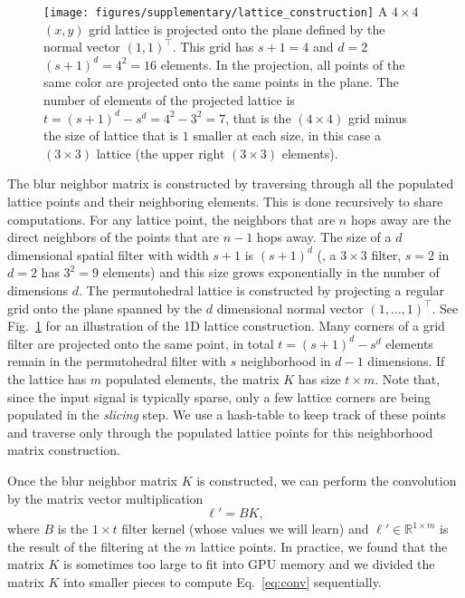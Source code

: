 \begin{figure}[t!]
  \centering
    \texttt{[image: figures/supplementary/lattice\_construction]}
  {A $4\times 4$ $(x,y)$ grid lattice is projected onto the plane defined by the normal
  vector $(1,1)^{\top}$. This grid has $s+1=4$ and $d=2$ $(s+1)^{d}=4^2=16$ elements.
  In the projection, all points of the same color are projected onto the same points in the plane.
  The number of elements of the projected lattice is $t=(s+1)^d-s^d=4^2-3^2=7$, that is
  the $(4\times 4)$ grid minus the size of lattice that is $1$ smaller at each size, in this
  case a $(3\times 3)$ lattice (the upper right $(3\times 3)$ elements).
  }
\label{fig:latticeconstruction}
\end{figure}

The blur neighbor matrix is constructed by traversing through all the populated
lattice points and their neighboring elements.
This is done recursively to share computations. For any lattice point, the neighbors that are
$n$ hops away are the direct neighbors of the points that are $n-1$ hops away.
The size of a $d$ dimensional spatial filter with width $s+1$ is $(s+1)^{d}$ (\eg, a
$3\times 3$ filter, $s=2$ in $d=2$ has $3^2=9$ elements) and this size grows
exponentially in the number of dimensions $d$. The permutohedral lattice is constructed by
projecting a regular grid onto the plane spanned by the $d$ dimensional normal vector ${(1,\ldots,1)}^{\top}$. See
Fig.~\ref{fig:latticeconstruction} for an illustration of the 1D lattice construction.
Many corners of a grid filter are projected onto the same point, in total $t = {(s+1)}^{d} -
s^{d}$ elements remain in the permutohedral filter with $s$ neighborhood in $d-1$ dimensions.
If the lattice has $m$ populated elements, the
matrix $K$ has size $t\times m$. Note that, since the input signal is typically
sparse, only a few lattice corners are being populated in the \textit{slicing} step.
We use a hash-table to keep track of these points and traverse only through
the populated lattice points for this neighborhood matrix construction.

Once the blur neighbor matrix $K$ is constructed, we can perform the convolution
by the matrix vector multiplication
\begin{equation}
\ell' = BK,
\label{eq:conv}
\end{equation}
where $B$ is the $1 \times t$ filter kernel (whose values we will learn) and $\ell'\in\mathbb{R}^{1\times m}$
is the result of the filtering at the $m$ lattice points. In practice, we found that the
matrix $K$ is sometimes too large to fit into GPU memory and we divided the matrix $K$
into smaller pieces to compute Eq.~\ref{eq:conv} sequentially.

